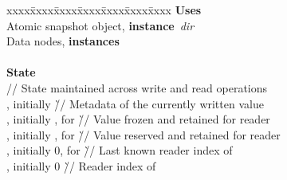\documentclass[oribibl]{llncs}
\theoremstyle{definition-boldhead}
\newcommand{\var}[1]{\textit{#1}}
\newcommand{\instance}[1]{\textbf{instance}~\var{#1}}
\newcommand{\nodes}{nodes\xspace}
\begin{document}
\begin{alg}\small
\begin{tabbing}
xxxx\=xxxx\=xxxx\=xxxx\=xxxx\=xxxx\=xxxx\kill
\if\submit\no
  \textbf{Uses} \\
  \> Atomic snapshot object, \instance{dir} \\
  \> Data \nodes, \textbf{instances}  \\
  \\
\fi
  \textbf{State} \\
  \> // State maintained across write and read operations \\

\> , initially 
     \` // Metadata of the currently written value \\
  \> , initially ,
     for 
     \` // Value frozen and retained for reader  \\
  \> , initially ,
     for 
     \` // Value reserved and retained for reader~ \\
  \> , initially 0, for 
     \` // Last known reader index of~ \\

\> , initially 0
  \` // Reader index of~ \\


\end{tabbing}
\end{alg}
\end{document}
